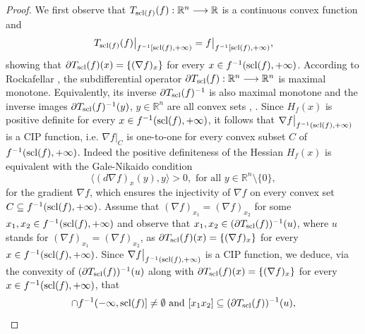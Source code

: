 \documentclass[12pt,twoside,reqno]{amsart}
\theoremstyle{definition}
\numberwithin{equation}{section}
\begin{document}
\begin{proof} We first observe that $T_{{\rm scl}(f)}(f):\mathbb{R}^n\longrightarrow\mathbb{R}$ is a continuous convex function and 
\[T_{{\rm scl}(f)}(f)\big|_{f^{-1}[{\rm scl}(f),+\infty)}=f\big|_{f^{-1}[{\rm scl}(f),+\infty)},\]
showing that $\partial T_{\rm scl}(f)(x)=\{(\nabla f)_{x}\}$ for every $x\in f^{-1}({\rm scl}(f),+\infty)$.
According to Rockafellar \cite[Theorem A]{Rockafellar}, the subdifferential operator $\partial T_{\rm scl}(f):\mathbb{R}^n\longrightarrow\mathbb{R}^n$
is maximal monotone. Equivalently, its inverse $\partial T_{\rm scl}(f)^{-1}$ is also maximal monotone and the inverse images $\partial T_{\rm scl}(f)^{-1}(y)$,
$y\in\mathbb{R}^n$ are all convex sets \cite[p. 340]{Rockafellar}, \cite[p. 3, 9, 16]{Phelps}.
Since $H_f(x)$ is positive definite for every $x\in f^{-1}({\rm scl}(f),+\infty)$, it follows that
$\nabla f\big|_{f^{-1}({\rm scl}(f),+\infty)}$ is a CIP function, i.e. $\nabla f\big|_C$ is one-to-one for every convex subset $C$ of 
$f^{-1}({\rm scl}(f),+\infty)$. Indeed the positive definiteness of the Hessian  $H_f(x)$ is equivalent with the Gale-Nikaido \cite{GaleNikaido} condition 
\[
 \langle (d\nabla f)_x(y),y\rangle>0,\mbox{ for all }y\in\mathbb{R}^n\setminus\{0\},
\]
for the gradient $\nabla f$,
which ensures the injectivity of $\nabla f$ on every convex set $C\subseteq f^{-1}({\rm scl}(f),+\infty)$.
Assume that $(\nabla f)_{x_1}=(\nabla f)_{x_2}$ for some $x_1, x_2\in f^{-1}({\rm scl}(f),+\infty)$ and observe that
$x_1,x_2\in (\partial T_{\rm scl}(f))^{-1}(u)$, where $u$ stands for  $(\nabla f)_{x_1}=(\nabla f)_{x_2}$, 
as $\partial T_{\rm scl}(f)(x)=\{(\nabla f)_{x}\}$ for every $x\in f^{-1}({\rm scl}(f),+\infty)$.
Since $\nabla f\big|_{f^{-1}({\rm scl}(f),+\infty)}$ is a CIP function, we deduce, via the convexity of $(\partial T_{\rm scl}(f))^{-1}(u)$ along with
$\partial T_{\rm scl}(f)(x)=\{(\nabla f)_{x}\}$ for every $x\in f^{-1}({\rm scl}(f),+\infty)$,
that 
\begin{equation}
[x_1x_2]\cap f^{-1}(-\infty,{\rm scl}(f)]\neq\emptyset\mbox{ and }[x_1x_2]\subseteq 
(\partial T_{\rm scl}(f))^{-1}(u), \label{eq17.01.2026.1}

\end{equation}
\end{proof}
\end{document}
